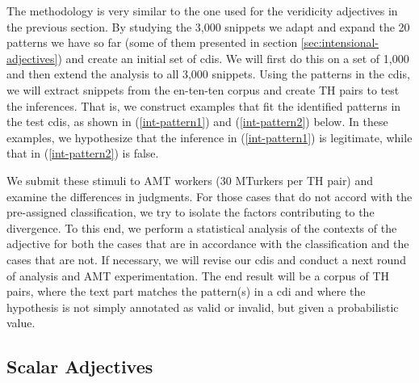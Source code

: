 \documentclass[10pt]{article}
\begin{document}
The methodology is very similar to the one used for the veridicity adjectives in the previous section. By studying the 3,000 snippets we adapt and expand the 20 patterns we have so far (some of them presented in section \ref{sec:intensional-adjectives}) and create an initial set of {\sc cdi}s. We will first do this on a set of 1,000 and then extend the analysis to all 3,000 snippets. Using the patterns in the {\sc cdi}s, we will extract snippets from  the en-ten-ten corpus and create TH pairs to test the inferences. That is, we construct examples that fit the identified patterns in the test {\sc cdi}s, as shown in (\ref{int-pattern1}) and (\ref{int-pattern2}) below. In these examples, we hypothesize that the inference in (\ref{int-pattern1}) is legitimate, while that in (\ref{int-pattern2}) is false. 

\vspace {-3mm}

\begin{multicols}{2}

\vspace {-6mm}

\end{multicols}
\vspace {-2mm}

\noindent 
We submit these stimuli to AMT workers (30 MTurkers per TH pair) and examine the differences in judgments. For those cases that do not accord with the pre-assigned classification, we try to isolate the factors contributing to the divergence. To this end, we perform a statistical analysis of the contexts of the adjective for both the cases that are in accordance with the classification and the cases that are not. 
If necessary, we will revise our {\sc cdi}s and conduct a next round of analysis and AMT experimentation. The end result will be a corpus of TH pairs, where the {\sc text}  part matches the pattern(s) in a {\sc cdi} and where the {\sc hypothesis} is not simply annotated as valid or invalid, but given a probabilistic value.

\vspace {-3mm}

\subsection{\label{scalar}Scalar Adjectives}
\end{document}
